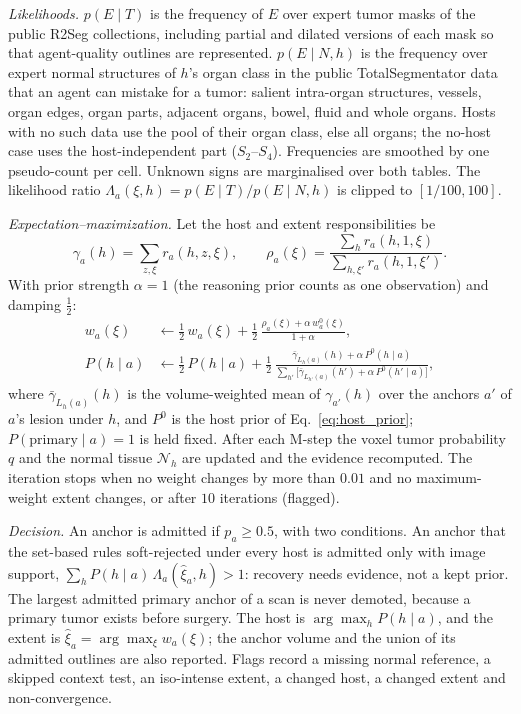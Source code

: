\documentclass[fleqn,10pt]{olplainarticle}
\begin{document}
\emph{Likelihoods.} $p(E\mid T)$ is the frequency of $E$ over expert tumor masks of the public R2Seg collections, including
partial and dilated versions of each mask so that agent-quality outlines are represented. $p(E\mid N,h)$ is the frequency over
expert normal structures of $h$'s organ class in the public TotalSegmentator data that an agent can mistake for a tumor:
salient intra-organ structures, vessels, organ edges, organ parts, adjacent organs, bowel, fluid and whole organs. Hosts with
no such data use the pool of their organ class, else all organs; the no-host case uses the host-independent part
($S_2$--$S_4$). Frequencies are smoothed by one pseudo-count per cell. Unknown signs are marginalised over both tables. The
likelihood ratio $\Lambda_a(\xi,h)=p(E\mid T)/p(E\mid N,h)$ is clipped to $[1/100,100]$.

\emph{Expectation--maximization.} Let the host and extent responsibilities be
\begin{equation*}
\gamma_a(h)=\sum_{z,\xi}r_a(h,z,\xi),\qquad
\rho_a(\xi)=\frac{\sum_h r_a(h,1,\xi)}{\sum_{h,\xi'}r_a(h,1,\xi')}.
\end{equation*}
With prior strength $\alpha=1$ (the reasoning prior counts as one observation) and damping $\tfrac12$:
\begin{equation}
\label{eq:mstep}
\begin{aligned}
w_a(\xi)&\leftarrow\tfrac12\,w_a(\xi)+\tfrac12\,\frac{\rho_a(\xi)+\alpha\,w^{0}_a(\xi)}{1+\alpha},\\
P(h\mid a)&\leftarrow\tfrac12\,P(h\mid a)+\tfrac12\,\frac{\bar\gamma_{L_h(a)}(h)+\alpha\,P^{0}(h\mid a)}{\sum_{h'}\bigl[\bar\gamma_{L_{h'}(a)}(h')+\alpha\,P^{0}(h'\mid a)\bigr]},
\end{aligned}
\end{equation}
where $\bar\gamma_{L_h(a)}(h)$ is the volume-weighted mean of $\gamma_{a'}(h)$ over the anchors $a'$ of $a$'s lesion under $h$, and
$P^{0}$ is the host prior of Eq.~\eqref{eq:host_prior}; $P(\text{primary}\mid a)=1$ is held fixed. After each M-step the voxel
tumor probability $q$ and the normal tissue $\mathcal{N}_h$ are updated and the evidence recomputed. The iteration stops when no
weight changes by more than $0.01$ and no maximum-weight extent changes, or after $10$ iterations (flagged).

\emph{Decision.} An anchor is admitted if $p_a\ge0.5$, with two conditions. An anchor that the set-based rules soft-rejected
under every host is admitted only with image support, $\sum_h P(h\mid a)\,\Lambda_a(\hat\xi_a,h)>1$: recovery needs evidence, not
a kept prior. The largest admitted primary anchor of a scan is never demoted, because a primary tumor exists before surgery.
The host is $\arg\max_h P(h\mid a)$, and the extent is $\hat\xi_a=\arg\max_\xi w_a(\xi)$; the anchor volume and the union of its
admitted outlines are also reported. Flags record a missing normal reference, a skipped context test, an iso-intense extent, a
changed host, a changed extent and non-convergence.
\end{document}
